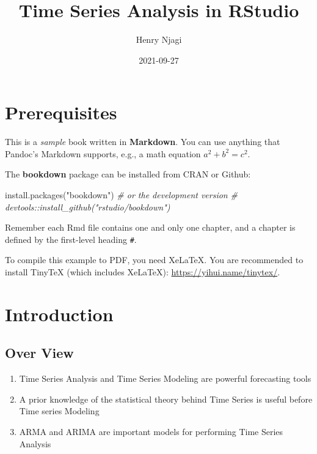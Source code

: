 \documentclass[
]{book}
\title{Time Series Analysis in RStudio}
\author{Henry Njagi}
\date{2021-09-27}
\newenvironment{Shaded}{\begin{snugshade}}{\end{snugshade}}
\newcommand{\CommentTok}[1]{\textcolor[rgb]{0.56,0.35,0.01}{\textit{#1}}}
\newcommand{\FunctionTok}[1]{\textcolor[rgb]{0.00,0.00,0.00}{#1}}
\newcommand{\NormalTok}[1]{#1}
\newcommand{\StringTok}[1]{\textcolor[rgb]{0.31,0.60,0.02}{#1}}
\begin{document}
\maketitle

{
\setcounter{tocdepth}{1}
\tableofcontents
}
\hypertarget{prerequisites}{%
\chapter{Prerequisites}\label{prerequisites}}

This is a \emph{sample} book written in \textbf{Markdown}. You can use anything that Pandoc's Markdown supports, e.g., a math equation \(a^2 + b^2 = c^2\).

The \textbf{bookdown} package can be installed from CRAN or Github:

\begin{Shaded}
\begin{Highlighting}[]
\FunctionTok{install.packages}\NormalTok{(}\StringTok{"bookdown"}\NormalTok{)}
\CommentTok{\# or the development version}
\CommentTok{\# devtools::install\_github("rstudio/bookdown")}
\end{Highlighting}
\end{Shaded}

Remember each Rmd file contains one and only one chapter, and a chapter is defined by the first-level heading \texttt{\#}.

To compile this example to PDF, you need XeLaTeX. You are recommended to install TinyTeX (which includes XeLaTeX): \url{https://yihui.name/tinytex/}.

\hypertarget{intro}{%
\chapter{Introduction}\label{intro}}

\hypertarget{over-view}{%
\section{Over View}\label{over-view}}

\begin{enumerate}
\def\labelenumi{\roman{enumi}.}
\item
  Time Series Analysis and Time Series Modeling are powerful forecasting tools
\item
  A prior knowledge of the statistical theory behind Time Series is useful before Time series Modeling
\item
  ARMA and ARIMA are important models for performing Time Series Analysis
\end{enumerate}
\end{document}
